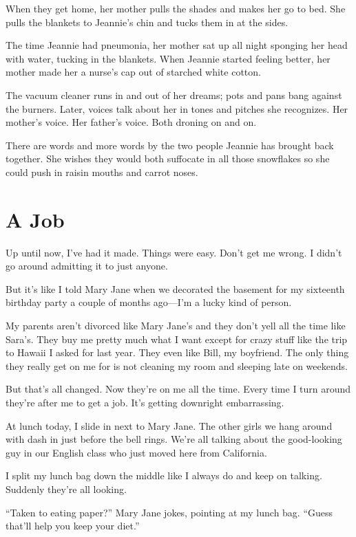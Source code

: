 \documentclass[twoside,10pt]{book}
\begin{document}
When they get home, her mother pulls the shades and makes her go to bed.
She pulls the blankets to Jeannie's chin and tucks them in at the sides.

The time Jeannie had pneumonia, her mother sat up all night sponging her
head with water, tucking in the blankets. When Jeannie started feeling
better, her mother made her a nurse's cap out of starched white cotton.

The vacuum cleaner runs in and out of her dreams; pots and pans bang
against the burners. Later, voices talk about her in tones and pitches
she recognizes. Her mother's voice. Her father's voice. Both droning on
and on.

There are words and more words by the two people Jeannie has brought
back together. She wishes they would both suffocate in all those
snowflakes so she could push in raisin mouths and carrot noses.


\cleardoublepage
\chapter{A Job}

Up until now, I've had it made. Things were easy. Don't get me wrong. I
didn't go around admitting it to just anyone.

But it's like I told Mary Jane when we decorated the basement for my
sixteenth birthday party a couple of months ago---I'm a lucky kind of
person.

My parents aren't divorced like Mary Jane's and they don't yell all the
time like Sara's. They buy me pretty much what I want except for crazy
stuff like the trip to Hawaii I asked for last year. They even like
Bill, my boyfriend. The only thing they really get on me for is not
cleaning my room and sleeping late on weekends.

But that's all changed. Now they're on me all the time. Every time I
turn around they're after me to get a job. It's getting downright
embarrassing.

At lunch today, I slide in next to Mary Jane. The other girls we hang
around with dash in just before the bell rings. We're all talking about
the good-looking guy in our English class who just moved here from
California.

I split my lunch bag down the middle like I always do and keep on
talking. Suddenly they're all looking.

``Taken to eating paper?'' Mary Jane jokes, pointing at my lunch bag.
``Guess that'll help you keep your diet.''
\end{document}
